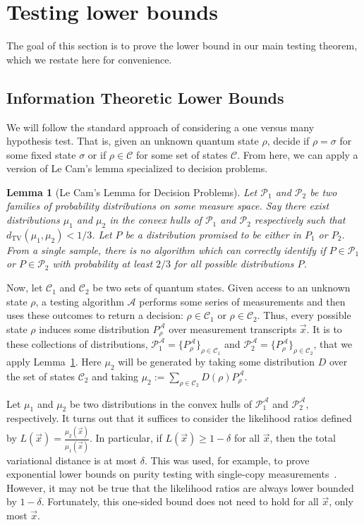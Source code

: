\documentclass[11pt]{article}
\newtheorem{lemma}[theorem]{Lemma}
\newcommand{\TV}{d_{\text{TV}}}
\begin{document}
\section{Testing lower bounds}
The goal of this section is to prove the lower bound in our main testing theorem, which we restate here for convenience.
\testingupper*

\subsection{Information Theoretic Lower Bounds}
We will follow the standard approach of considering a one versus many hypothesis test. That is, given an unknown quantum state $\rho$, decide if $\rho=\sigma$ for some fixed state $\sigma$ or if $\rho \in \mathcal{C}$ for some set of states $\mathcal{C}$. From here, we can apply a version of Le Cam's lemma specialized to decision problems.

\begin{lemma}[Le Cam's Lemma for Decision Problems]\label{lem:lecam}
    Let $\mathcal{P}_1$ and $\mathcal{P}_2$ be two families of probability distributions on some measure space. Say there exist distributions $\mu_1$ and $\mu_2$ in the convex hulls of $\mathcal{P}_1$ and $\mathcal{P}_2$ respectively such that $\TV(\mu_1,\mu_2) < 1/3$. Let $P$ be a distribution promised to be either in $P_1$ or $P_2$. From a single sample, there is no algorithm which can correctly identify if $P \in \mathcal{P}_1$ or $P \in \mathcal{P}_2$ with probability at least $2/3$ for all possible distributions $P$.
\end{lemma}

Now, let $\mathcal{C}_1$ and $\mathcal{C}_2$ be two sets of quantum states. Given access to an unknown state $\rho$, a testing algorithm $\mathcal{A}$ performs some series of measurements and then uses these outcomes to return a decision: $\rho \in \mathcal{C}_1$ or $\rho \in \mathcal{C}_2$. Thus, every possible state $\rho$ induces some distribution $P_\rho^{\mathcal{A}}$ over measurement transcripts $\vec{x}$. It is to these collections of distributions, $\mathcal{P}_1^{\mathcal{A}} = \{P_\rho^{\mathcal{A}}\}_{\rho \in \mathcal{C}_1}$ and $\mathcal{P}_2^{\mathcal{A}} = \{P_\rho^{\mathcal{A}}\}_{\rho \in \mathcal{C}_2}$, that we apply Lemma~\ref{lem:lecam}. Here $\mu_2$ will be generated by taking some distribution $D$ over the set of states $\mathcal{C}_2$ and taking $\mu_2 := \sum_{\rho \in \mathcal{C}_2} D(\rho) P_\rho^{\mathcal{A}}$.


Let $\mu_1$ and $\mu_2$ be two distributions in the convex hulls of $\mathcal{P}_1^{\mathcal{A}}$ and $\mathcal{P}_2^{\mathcal{A}}$, respectively. It turns out that it suffices to consider the likelihood ratios defined by $L(\vec{x})  = \frac{\mu_2(\vec{x})}{\mu_1(\vec{x})}$. In particular, if $L(\vec{x}) \geq 1-\delta$ for all $\vec{x}$, then the total variational distance is at most $\delta$. This was used, for example, to prove exponential lower bounds on purity testing with single-copy measurements~\cite{chen2022exponential}. 
However, it may not be true that the likelihood ratios are always lower bounded by $1-\delta$. Fortunately, this one-sided bound does not need to hold for all $\vec{x}$, only most $\vec{x}$.
\end{document}
